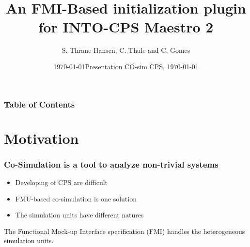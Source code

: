 \documentclass{beamer}
\title[An FMI-Based initialization plugin for INTO-CPS Maestro 2] %
{An FMI-Based initialization plugin for INTO-CPS Maestro 2}
\date{\today}
\author[Thrane Hansen, Simon] %
{S. Thrane Hansen\inst{1}, C. Thule\inst{1} and C. Gomes\inst{1}}
\institute[AU] %
{
  \inst{1}%
  Department of Engineering\\
  Computer Engineering \\
  Aarhus University
}
\date[AU 2020] %
{Presentation CO-sim CPS, \today}
\begin{document}
\frame{\titlepage}

\begin{frame}
\frametitle{Table of Contents}
\tableofcontents
\end{frame}

\section{Motivation}
\begin{frame}
\frametitle{Co-Simulation is a tool to analyze \textbf{non-trivial} systems}
\begin{itemize}
    \item Developing of CPS are difficult
    \item FMU-based co-simulation is one solution
    \item The simulation units have different natures
\end{itemize}
The Functional Mock-up Interface specification (FMI) handles the heterogeneous simulation units.

\end{frame}
\end{document}
